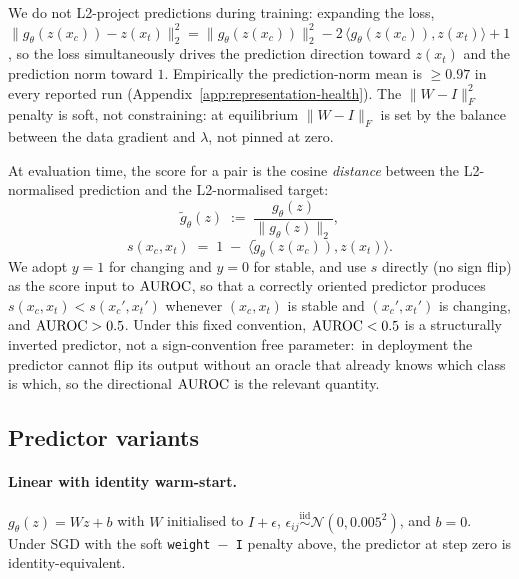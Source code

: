 We do not L2-project predictions during training: expanding the loss,
$\lVert g_{\theta}(z(x_{c})) - z(x_{t}) \rVert_{2}^{2}
= \lVert g_{\theta}(z(x_{c})) \rVert_{2}^{2}
- 2\,\langle g_{\theta}(z(x_{c})), z(x_{t}) \rangle + 1$,
so the loss simultaneously drives the prediction direction toward
$z(x_{t})$ and the prediction norm toward $1$. Empirically the
prediction-norm mean is $\geq 0.97$ in every reported run
(Appendix~\ref{app:representation-health}). The
$\lVert W - I \rVert_{F}^{2}$ penalty is soft, not constraining: at
equilibrium $\lVert W - I \rVert_{F}$ is set by the balance between
the data gradient and $\lambda$, not pinned at zero.

At evaluation time, the score for a pair is the cosine
\emph{distance} between the L2-normalised prediction and the
L2-normalised target:
\begin{equation}
  \tilde{g}_{\theta}(z) \;:=\; \frac{g_{\theta}(z)}{\lVert g_{\theta}(z) \rVert_{2}},
  \label{eq:gtilde}
\end{equation}
\begin{equation}
  s(x_{c}, x_{t}) \;=\; 1 \;-\; \langle \tilde{g}_{\theta}(z(x_{c})), z(x_{t}) \rangle.
  \label{eq:score}
\end{equation}
We adopt $y = 1$ for changing and $y = 0$ for stable, and use $s$
directly (no sign flip) as the score input to $\mathrm{AUROC}$, so that a
correctly oriented predictor produces
$s(x_{c}, x_{t}) < s(x_{c}', x_{t}')$ whenever $(x_{c}, x_{t})$ is
stable and $(x_{c}', x_{t}')$ is changing, and $\mathrm{AUROC} > 0.5$. Under
this fixed convention, $\mathrm{AUROC} < 0.5$ is a structurally inverted
predictor, not a sign-convention free parameter:\ in deployment the
predictor cannot flip its output without an oracle that already knows
which class is which, so the directional $\mathrm{AUROC}$ is the relevant
quantity.

\subsection{Predictor variants}
\label{sec:method:predictor}

\paragraph{Linear with identity warm-start.}
$g_{\theta}(z) = W z + b$ with $W$ initialised to $I + \epsilon$,
$\epsilon_{ij} \overset{\text{iid}}{\sim} \mathcal{N}(0, 0.005^{2})$, and
$b = 0$. Under SGD with the soft \texttt{weight $-$ I} penalty above, the
predictor at step zero is identity-equivalent.

